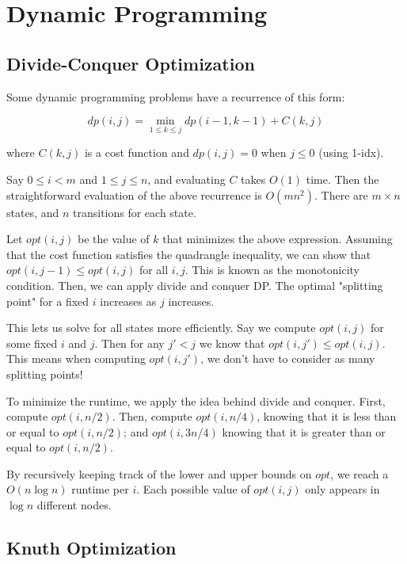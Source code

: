 \chapter{Dynamic Programming}

\section{Divide-Conquer Optimization}

    Some dynamic programming problems have a recurrence of this form:

        $$ dp(i, j) = \min_{1 \leq k \leq j} dp(i - 1, k - 1) + C(k, j) $$

        where $C(k, j)$ is a cost function and $dp(i, j) = 0$ when $j \leq 0$ (using 1-idx).

        Say $ 0 \leq i < m $ and $1 \leq j \leq n$, and evaluating $C$ takes $O(1)$ time. 
        Then the straightforward evaluation of the above recurrence is $O(m n^2)$. There are
        $m \times n$ states, and $n$ transitions for each state.

        Let $opt(i, j)$ be the value of $k$ that minimizes the above expression. 
        Assuming that the cost function satisfies the quadrangle inequality, we can show that
        $opt(i, j-1) \leq opt(i, j)$ for all $i, j$. This is known as the monotonicity condition. 
        Then, we can apply divide and conquer DP. The optimal "splitting point" for a fixed 
        $i$ increases as $j$ increases.

        This lets us solve for all states more efficiently. Say we compute 
        $opt(i, j)$ for some fixed $i$ and $j$. 
        Then for any $j' < j$ we know that $opt(i, j') \leq opt(i, j)$. 
        This means when computing $opt(i, j')$, we don't have to consider as many splitting points!

        To minimize the runtime, we apply the idea behind divide and conquer. First, compute
        $opt(i, n / 2)$. Then, compute 
        $opt(i, n / 4)$, knowing that it is less than or equal to $opt(i, n / 2)$; 
        and $opt(i, 3 n / 4)$ knowing that it is greater than or equal to $opt(i, n / 2)$. 
        
        By recursively keeping track of the lower and upper bounds on 
        $opt$, we reach a $O(n \log n)$ runtime per $i$. Each possible value of $opt(i, j)$ only appears in $\log n$ different nodes.


\section{Knuth Optimization}

